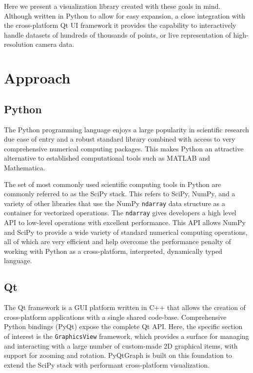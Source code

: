 Here we present a visualization library created with these goals in mind. Although written in Python to allow for easy expansion, a close integration with the cross-platform Qt UI framework\cite{Qt} it provides the capability to interactively handle datasets of hundreds of thousands of points, or live representation of high-resolution camera data.

\makeBasicPlottingFig

\section{Approach}
\subsection{Python}
The Python programming language enjoys a large popularity in scientific research due ease of entry and a robust standard library combined with access to very comprehensive numerical computing packages. This makes Python an attractive alternative to established computational tools such as MATLAB\cite{matlab} and Mathematica. %

The set of most commonly used scientific computing tools in Python are commonly referred to as the SciPy stack. %
This refers to SciPy, NumPy, and a variety of other libraries that use the NumPy \texttt{ndarray} data structure as a container for vectorized operations. The \texttt{ndarray} gives developers a high level API to low-level operations with excellent performance. This API allows NumPy and SciPy to provide a wide variety of standard numerical computing operations, all of which are very efficient and help overcome the performance penalty of working with Python as a cross-platform, interpreted, dynamically typed language.

\subsection{Qt}
The Qt framework is a GUI platform written in C++ that allows the creation of cross-platform applications with a single shared code-base. Comprehensive Python bindings (PyQt) expose the complete Qt API. Here, the specific section of interest is the \texttt{GraphicsView} framework, which provides a surface for managing and interacting with a large number of custom-made 2D graphical items, with support for zooming and rotation\cite{QtGraphicsView}. PyQtGraph is built on this foundation to extend the SciPy stack with performant cross-platform visualization.


